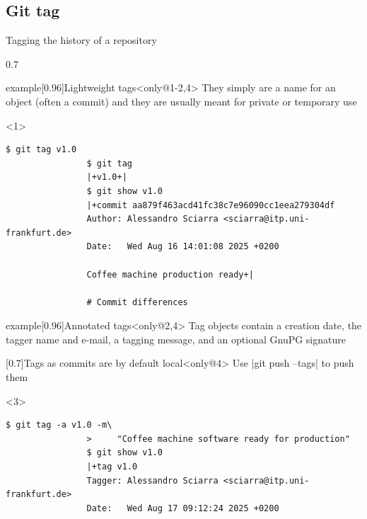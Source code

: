 \subsection{Git tag}
\begin{frame}[fragile]{Tagging the history of a repository}
    \vspace{-8mm}
    \begin{overlayarea}{\textwidth}{0.7\textheight}
        \begin{varblock}{example}[0.96\textwidth]{Lightweight tags}<only@1-2,4>
            They simply are a name for an object (often a commit) and they are usually meant for private or temporary use
        \end{varblock}
        \begin{onlyenv}<1>
            \begin{lstlisting}[style=MyBash]
                $ git tag v1.0
                $ git tag
                |+v1.0+|
                $ git show v1.0
                |+commit aa879f463acd41fc38c7e96090cc1eea279304df
                Author: Alessandro Sciarra <sciarra@itp.uni-frankfurt.de>
                Date:   Wed Aug 16 14:01:08 2025 +0200

                Coffee machine production ready+|

                # Commit differences
            \end{lstlisting}
        \end{onlyenv}
        \begin{varblock}{example}[0.96\textwidth]{Annotated tags}<only@2,4>
            Tag objects contain a creation date, the tagger name and e-mail, a tagging message, and an optional GnuPG signature
        \end{varblock}
        \begin{varblock}{}[0.7\textwidth]{Tags as commits are by default local}<only@4>
            Use \;\bash|git push --tags|\; to push them
        \end{varblock}
        \begin{onlyenv}<3>
            \begin{lstlisting}[style=MyBash, aboveskip=7mm]
                $ git tag -a v1.0 -m\
                >     "Coffee machine software ready for production"
                $ git show v1.0
                |+tag v1.0
                Tagger: Alessandro Sciarra <sciarra@itp.uni-frankfurt.de>
                Date:   Wed Aug 17 09:12:24 2025 +0200


\end{lstlisting}
\end{onlyenv}
\end{overlayarea}
\end{frame}
